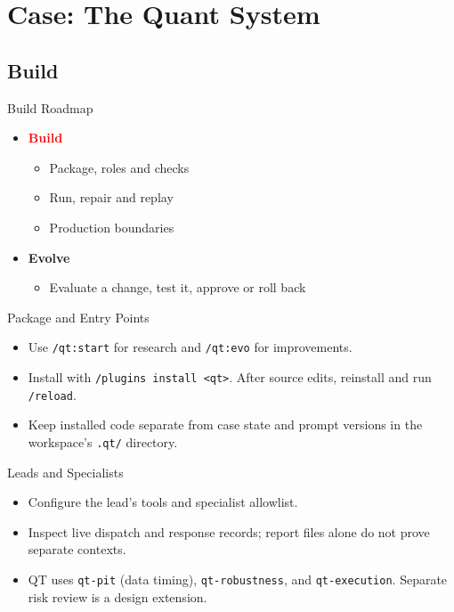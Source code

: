 \section{Case: The Quant System}
\subsection{Build}

\begin{frame}{Build Roadmap}
\begin{itemize}
\item \textcolor{red}{\textbf{Build}}
\begin{itemize}
\item Package, roles and checks
\item Run, repair and replay
\item Production boundaries
\end{itemize}
\item \textcolor{black!55}{\textbf{Evolve}}
\begin{itemize}
\item \textcolor{black!55}{Evaluate a change, test it, approve or roll back}
\end{itemize}
\end{itemize}
\end{frame}

\begin{frame}{Package and Entry Points}
\begin{center}

\end{center}
\begin{itemize}
\item Use \texttt{/qt:start} for research and \texttt{/qt:evo} for improvements.
\item Install with \texttt{/plugins install <qt>}. After source edits, reinstall and run \texttt{/reload}.
\item Keep installed code separate from case state and prompt versions in the workspace's \texttt{.qt/} directory.
\end{itemize}
\end{frame}

\begin{frame}{Leads and Specialists}
\begin{center}

\end{center}
\begin{itemize}
\item Configure the lead's tools and specialist allowlist.
\item Inspect live dispatch and response records; report files alone do not prove separate contexts.
\item QT uses \texttt{qt-pit} (data timing), \texttt{qt-robustness}, and \texttt{qt-execution}. Separate risk review is a design extension.
\end{itemize}
\end{frame}

